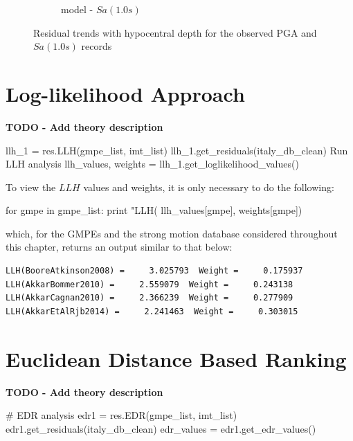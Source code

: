 \begin{figure}[htb]
\begin{subfigure}[b]{0.49\textwidth}
     \caption{\cite{Akkar_etal2014} model - $Sa \left( {1.0 s} \right)$}
      \label{fig:sa1_depth_akkar2014}
  \end{subfigure}
  \caption{Residual trends with hypocentral depth for the observed PGA and $Sa \left( {1.0 s} \right)$ records}
  \label{fig:depth_resid}
\end{figure}

\section{Log-likelihood Approach \cite{Scherbaum_etal2009}}
\label{sec:llh}

\textbf{TODO - Add theory description}

\begin{python}[frame=single]
llh_1 = res.LLH(gmpe_list, imt_list)
llh_1.get_residuals(italy_db_clean)
 Run LLH analysis
llh_values, weights = llh_1.get_loglikelihood_values()
\end{python}

To view the $LLH$ values and weights, it is only necessary to do the following:

\begin{python}
for gmpe in gmpe_list:
    print "LLH(%
                                               llh_values[gmpe],     
                                               weights[gmpe])
\end{python}

\noindent which, for the GMPEs and the strong motion database considered throughout this chapter, returns an output similar to that below:

\begin{verbatim}
LLH(BooreAtkinson2008) =     3.025793  Weight =     0.175937
LLH(AkkarBommer2010) =     2.559079  Weight =     0.243138
LLH(AkkarCagnan2010) =     2.366239  Weight =     0.277909
LLH(AkkarEtAlRjb2014) =     2.241463  Weight =     0.303015
\end{verbatim}


\section{Euclidean Distance Based Ranking \cite{KaleAkkar2013}}
\label{sec:edr}

\textbf{TODO - Add theory description}

\begin{python}[frame=single]
# EDR analysis
edr1 = res.EDR(gmpe_list, imt_list)
edr1.get_residuals(italy_db_clean)
edr_values = edr1.get_edr_values()
\end{python}

